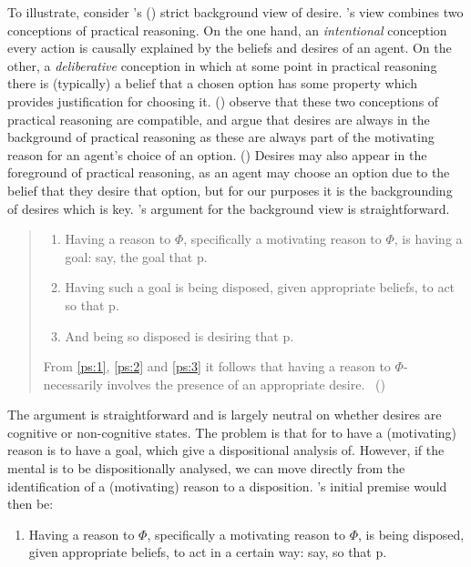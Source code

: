 \documentclass[10pt]{article}
\begin{document}
To illustrate, consider \citeauthor{Pettit:1990aa}'s (\citeyear{Pettit:1990aa}) strict background view of desire.
\citeauthor{Pettit:1990aa}'s view  combines two conceptions of practical reasoning.
On the one hand, an \emph{intentional} conception every action is causally explained by the beliefs and desires of an agent.
On the other, a \emph{deliberative} conception in which at some point in practical reasoning there is (typically) a belief that a chosen option has some property which provides justification for choosing it.
(\citeyear[565--566]{Pettit:1990aa})
\citeauthor{Pettit:1990aa} observe that these two conceptions of practical reasoning are compatible, and argue that desires are always in the background of practical reasoning as these are always part of the motivating reason for an agent's choice of an option.
(\citeyear[573]{Pettit:1990aa})
Desires may also appear in the foreground of practical reasoning, as an agent may choose an option due to the belief that they desire that option, but for our purposes it is the backgrounding of desires which is key.
\citeauthor{Pettit:1990aa}'s argument for the background view is straightforward.
\begin{quote}
  \begin{enumerate}[label=\arabic*., ref=(\arabic*)]
  \item\label{ps:1} Having a reason to \(\Phi\), specifically a motivating reason to \(\Phi\), is having a goal: say, the goal that p.
  \item\label{ps:2} Having such a goal is being disposed, given appropriate beliefs, to act so that p.
  \item\label{ps:3} And being so disposed is desiring that p.
  \end{enumerate}
  From \ref{ps:1}, \ref{ps:2} and \ref{ps:3} it follows that having a reason to \(\Phi\)-necessarily involves the presence of an appropriate desire.\nolinebreak
  \mbox{ }\hfill(\citeyear[573]{Pettit:1990aa})
\end{quote}
The argument is straightforward and is largely neutral on whether desires are cognitive or non-cognitive states.
The problem is that for \citeauthor{Pettit:1990aa} to have a (motivating) reason is to have a goal, which \citeauthor{Pettit:1990aa} give a dispositional analysis of.
However, if the mental is to be dispositionally analysed, we can move directly from the identification of a (motivating) reason to a disposition.
\citeauthor{Pettit:1990aa}'s initial premise would then be:
\begin{enumerate}[label=\arabic*\('\)., ref=(\arabic*\('\))]
\item\label{ps:1R} Having a reason to \(\Phi\), specifically a motivating reason to \(\Phi\), is being disposed, given appropriate beliefs, to act in a certain way: say, so that p.
\end{enumerate}
\end{document}
